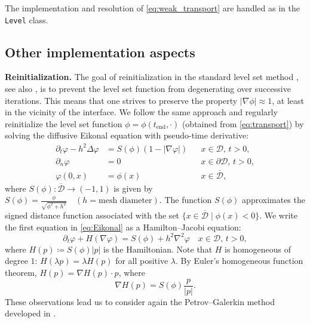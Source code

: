\documentclass[preprint,9pt]{elsarticle}
\begin{document}
The implementation and resolution of \eqref{eq:weak_transport} are handled
as in the \texttt{Level} class. 

\subsection{Other implementation aspects}\label{sub:other}

\textbf{Reinitialization.} 
The goal of reinitialization in the standard level set method \cite{MR965860},
see also \cite{MR3843884}, is to prevent the level set function
from degenerating over successive iterations.
This means that one strives to preserve the property $|\nabla\phi|\approx 1$,
at least in the vicinity of the interface.
We follow the same approach and regularly reinitialize the level set function
$\phi = \phi(t_{\text{end}}, \cdot)$ (obtained from \eqref{eq:transport})
by solving the diffusive Eikonal equation with pseudo-time derivative:
\begin{equation}\label{eq:Eikonal}
\begin{aligned}
    \partial_t \varphi - h^2 \Delta \varphi &= S(\phi)(1 - |\nabla \varphi|)
    && x\in \mathcal{D},\, t>0, \\
    \partial_n \varphi &= 0
    && x\in \partial\mathcal{D},\, t>0, \\
	\varphi(0, x) &= \phi(x)
	&& x\in \overline{\mathcal{D}},
\end{aligned}
\end{equation}
where $S(\phi)\colon\overline{\mathcal{D}}\to (-1, 1)$ is given by 
$
	S(\phi) = \frac{\phi}{\sqrt{\phi^2 + h^2}}\quad (h= \text{mesh diameter}).
$
The function $S(\phi)$ approximates the signed distance function associated
with the set $\{x\in\overline{\mathcal{D}} \mid \phi(x)<0\}$.
We write the first equation in \eqref{eq:Eikonal}
as a Hamilton--Jacobi equation:
\begin{equation}\label{eq:HJ}
	\partial_t \varphi + H(\nabla \varphi) =
	S(\phi) + h^2 \nabla^2\varphi \quad x\in \mathcal{D},\, t>0,
\end{equation}
where $H(p) \coloneqq S(\phi) |p|$ is the Hamiltonian.
Note that $H$ is homogeneous of degree $1$: $H(\lambda p) = \lambda H(p)$
for all positive $\lambda$. By Euler's homogeneous function theorem,
$H(p) = \nabla H (p) \cdot p$, where
\begin{equation}\label{eq:grad_H}
	\nabla H (p) = S(\phi)\frac{p}{|p|}.
\end{equation}
These observations lead us to consider again
the Petrov--Galerkin method developed in \cite{MR1640142}. 
\end{document}
